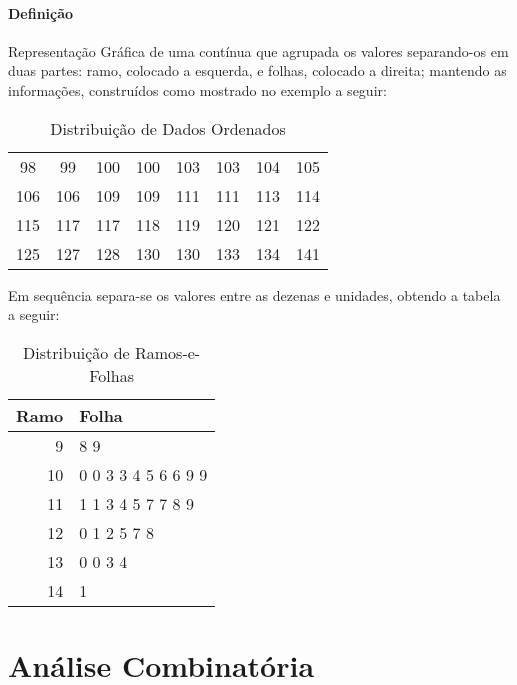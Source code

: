 \documentclass{article}
\begin{document}
            \paragraph{Definição}Representação Gráfica de uma contínua que agrupada os valores separando-os em duas partes: ramo, colocado a esquerda, e folhas, colocado a direita; mantendo as informações, construídos como mostrado no exemplo a seguir:
                \begin{table}[H]
                    \centering
                    \begin{tabular}[]{cccccccc}\hline
                        98 &  99 & 100 & 100 & 103 & 103 & 104 & 105\\
                        106 & 106 & 109 & 109 & 111 & 111 & 113 & 114\\
                        115 & 117 & 117 & 118 & 119 & 120 & 121 & 122\\
                        125 & 127 & 128 & 130 & 130 & 133 & 134 & 141\\\hline
                    \end{tabular}
                    \caption{Distribuição de Dados Ordenados}\label{table:dataLeafs}
                \end{table} \noindent
            Em sequência separa-se os valores entre as dezenas e unidades, obtendo a tabela a seguir:
                \begin{table}[H]
                    \centering
                    \begin{tabular}[]{r|l}\hline
                        Ramo & Folha\\\hline
                         9   & 8 9\\
                        10   & 0 0 3 3 4 5 6 6 9 9\\
                        11   & 1 1 3 4 5 7 7 8 9\\
                        12   & 0 1 2 5 7 8\\
                        13   & 0 0 3 4\\
                        14   & 1\\\hline
                    \end{tabular}
                    \caption{Distribuição de Ramos-e-Folhas}\label{table:leafs}
                \end{table}
\newpage

    \section{Análise Combinatória}
\end{document}
